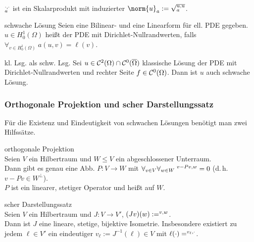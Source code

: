 \begin{Bem}
    $\sp{\cdot, \cdot}_a$ ist ein Skalarprodukt mit induzierter
     $\norm{u}_a := \sqrt{\sp{u, u}_a}$.
\end{Bem}

\linie

\begin{Def}{schwache Lösung}
    Seien eine Bilinear- und eine Linearform für ell. PDE gegeben.
    $u \in H^1_0(\Omega)$ heißt 
    der PDE mit Dirichlet-Nullrandwerten, falls $\forall_{v \in H^1_0(\Omega)}\; a(u,v) = \ell(v)$.
\end{Def}

\begin{Satz}{kl. Lsg. als schw. Lsg.}
    Sei $u \in \mathcal{C}^2(\Omega) \cap \mathcal{C}^0(\overline{\Omega})$ klassische Lösung der PDE mit
    Dirichlet-Nullrandwerten und rechter Seite $f \in \mathcal{C}^0(\Omega)$.
    Dann ist $u$ auch schwache Lösung.
\end{Satz}

\subsubsection{%
    Orthogonale Projektion und scher Darstellungssatz%
}

\begin{Bem}
    Für die Existenz und Eindeutigkeit von schwachen Lösungen benötigt man zwei Hilfssätze.
\end{Bem}

\begin{Satz}{orthogonale Projektion}\\
    Seien $V$ ein Hilbertraum und $W \le V$ ein abgeschlossener Unterraum.\\
    Dann gibt es genau eine Abb. $P\colon V \to W$ mit
    $\forall_{v \in V} \forall_{w \in W}\; \sp{v - Pv, w} = 0$
    (d.\,h. $v - Pv \in W^\bot$).\\
    $P$ ist ein linearer, stetiger Operator und heißt  auf $W$.
\end{Satz}

\begin{Satz}{scher Darstellungssatz}\\
    Seien $V$ ein Hilbertraum und $J\colon V \to V'$, $(Jv)(w) := \sp{v, w}$.\\
    Dann ist $J$ eine lineare, stetige, bijektive Isometrie.
    Insbesondere existiert zu jedem $\ell \in V'$ ein eindeutiger
     $v_\ell := J^{-1}(\ell) \in V$ mit
    $\ell(\cdot) = \sp{v_\ell, \cdot}$.
\end{Satz}

